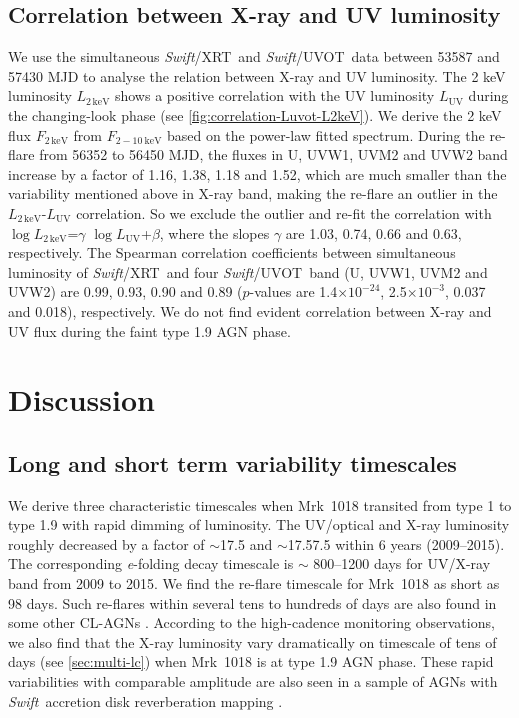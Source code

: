 \documentclass[twocolumn]{aastex63}
\newcommand{\swift}{{\small \it Swift}}
\newcommand{\xrt}{{\small {\it Swift}/XRT}}
\newcommand{\uvot}{{\small {\it Swift}/UVOT}}
\begin{document}
\subsection{Correlation between X-ray and UV luminosity}
\label{subsec:xray-uv}
We use the simultaneous \xrt\, and \uvot\, data between 53587 and 57430 MJD to analyse the relation between X-ray and UV luminosity. The 2 keV luminosity $L_\mathrm{{2\,keV}}$ shows a positive correlation with the UV luminosity $L_\mathrm{{UV}}$ during the changing-look phase (see \autoref{fig:correlation-Luvot-L2keV}). We derive the 2 keV flux $F_\mathrm{{2\,keV}}$ from $F_\mathrm{2-10~ keV}$ based on the power-law fitted spectrum.  During the re-flare from 56352 to 56450 MJD, the fluxes in U, UVW1, UVM2 and UVW2 band increase by a factor of 1.16, 1.38, 1.18 and 1.52, which are much smaller than the variability mentioned above in X-ray band, making the re-flare an outlier in the $L_\mathrm{{2\,keV}}$-$L_\mathrm{{UV}}$ correlation. So we exclude the outlier and re-fit the correlation with $\log{L_\mathrm{{2\,keV}}}$=$\gamma$  $\log{L_\mathrm{{UV}}}$+$\beta$, where the slopes $\gamma$ are 1.03, 0.74, 0.66 and 0.63, respectively. The Spearman correlation coefficients between simultaneous luminosity of \xrt\, and four \uvot\, band (U, UVW1, UVM2 and UVW2) are 0.99, 0.93, 0.90 and 0.89 ($p$-values are 1.4$\times10^{-24}$, 2.5$\times10^{-3}$, 0.037 and 0.018), respectively. We do not find evident correlation between X-ray and UV flux during the faint type 1.9 AGN phase.

 




\section{Discussion}\label{sec:discussion}
\subsection{Long and short term variability timescales}
We derive three characteristic timescales when Mrk~1018 transited from type 1 to type 1.9 with rapid dimming of luminosity. The UV/optical and X-ray luminosity roughly decreased by a factor of $\sim$17.5 and $\sim$17.57.5 within 6 years (2009--2015). The corresponding \textit{e}-folding decay timescale is $\sim$ 800--1200 days for UV/X-ray band from 2009 to 2015. We find the re-flare timescale for Mrk~1018 as short as 98 days. Such re-flares within several tens to hundreds of days are also found in some other CL-AGNs \citep[e.g.][]{2017MNRAS.467.1496O,2020MNRAS.498..718O}. According to the high-cadence monitoring observations, we also find that the X-ray luminosity vary dramatically on timescale of tens of days (see \autoref{sec:multi-lc}) when Mrk~1018 is at type 1.9 AGN phase. These rapid variabilities with comparable amplitude are also seen in a sample of AGNs with \swift\, accretion disk reverberation mapping \citep[see][]{2019ApJ...870..123E}. 
\end{document}
